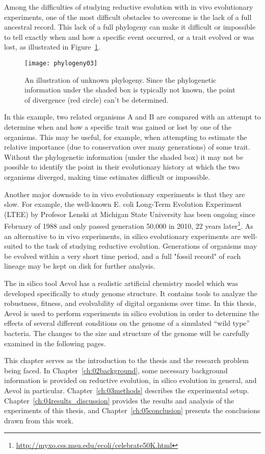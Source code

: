 Among the difficulties of studying reductive evolution with in vivo evolutionary experiments, one of the most difficult obstacles to overcome is the lack of a full ancestral record. This lack of a full phylogeny can make it difficult or impossible to tell exactly when and how a specific event occurred, or a trait evolved or was lost, as illustrated in Figure~\ref{fig:phylogeny03}. 
\begin{figure}[H]
\texttt{[image: phylogeny03]}
\centering
\caption[Unknown phylogeny]{An illustration of unknown phylogeny. Since the phylogenetic information under the shaded box is typically not known, the point of divergence (red circle) can't be determined.}
\label{fig:phylogeny03}
\end{figure}
In this example, two related organisms A and B are compared with an attempt to determine when and how a specific trait was gained or lost by one of the organisms. This may be useful, for example, when attempting to estimate the relative importance (due to conservation over many generations) of some trait. Without the phylogenetic information (under the shaded box) it may not be possible to identify the point in their evolutionary history at which the two organisms diverged, making time estimates difficult or impossible.

Another major downside to in vivo evolutionary experiments is that they are slow. For example, the well-known E. coli Long-Term Evolution Experiment (LTEE) by Profesor Lenski at Michigan State University has been ongoing since February of 1988 and only passed generation 50,000 in 2010, 22 years later\footnote{\url{http://myxo.css.msu.edu/ecoli/celebrate50K.html}}. As an alternative to in vivo experiments, in silico evolutionary experiments are well-suited to the task of studying reductive evolution. Generations of organisms may be evolved within a very short time period, and a full "fossil record" of each lineage may be kept on disk for further analysis. 

The in silico tool Aevol has a realistic artificial chemistry model which was developed specifically to study genome structure. It contains tools to analyze the robustness, fitness, and evolvability of digital organisms over time.  In this thesis, Aevol is used to perform experiments in silico evolution in order to determine the effects of several different conditions on the genome of a simulated ``wild type'' bacteria. The changes to the size and structure of the genome will be carefully examined in the following pages. 

This chapter serves as the introduction to the thesis and the research problem being faced. In Chapter~\ref{ch:02background}, some necessary background information is provided on reductive evolution, in silico evolution in general, and Aevol in particular. Chapter~\ref{ch:03methods} describes the experimental setup. Chapter~\ref{ch:04results_discussion}
provides the results and analysis of the experiments of this thesis, and Chapter~\ref{ch:05conclusion} presents the conclusions drawn from this work. 



